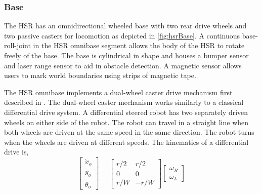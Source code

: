 \documentclass[12pt]{article}
\begin{document}
        \subsubsection{Base} 
            The HSR has an omnidirectional wheeled base with two rear drive wheels and two passive casters for locomotion as depicted in \cref{fig:hsrBase}. A continuous base-roll-joint \footnotemark in the HSR omnibase segment allows the body of the HSR to rotate freely of the base. The base is cylindrical in shape and houses a bumper sensor and laser range sensor to aid in obstacle detection. A magnetic sensor allows users to mark world boundaries using strips of magnetic tape.

            
            \par The HSR omnibase implements a dual-wheel caster drive mechanism first described in \cite{wada_caster_2000}. The dual-wheel caster mechanism works similarly to a classical differential drive system. A differential steered robot has two separately driven wheels on either side of the robot. The robot can travel in a straight line when both wheels are driven at the same speed in the same direction. The robot turns when the wheels are driven at different speeds. The kinematics of a differential drive is,
            \begin{equation}
                \begin{bmatrix}
                    \dot{x}_{o}\\
                    \dot{y}_{o}\\
                    \dot{\theta}_{o}
                \end{bmatrix}
                =
                \begin{bmatrix}
                    r/2 & r/2\\
                    0 & 0\\
                    r/W & -r/W
                \end{bmatrix}
                \begin{bmatrix}
                    \omega_{R}\\
                    \omega_{L}
                \end{bmatrix}
            \end{equation}
            
\end{document}
